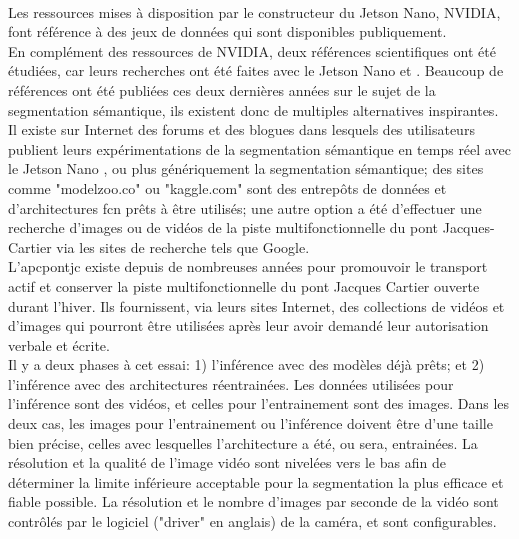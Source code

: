 ﻿\label{metho:data}
\vspace{\baselineskip}
\\
Les ressources mises à disposition par le constructeur du Jetson Nano, NVIDIA, font référence à des jeux de données qui sont disponibles publiquement.
\vspace{\baselineskip}
\\
\noindent En complément des ressources de NVIDIA, deux références scientifiques ont été étudiées, car leurs recherches ont été faites avec le Jetson Nano \parencite{nguyen_mavnet_2019} et \parencite{zheng_real-time_2020}. Beaucoup de références ont été publiées ces deux dernières années sur le sujet de la segmentation sémantique, ils existent donc de multiples alternatives inspirantes.
\vspace{\baselineskip}
\\
\noindent Il existe sur Internet des forums et des blogues dans lesquels des utilisateurs publient leurs expérimentations de la segmentation sémantique en temps réel avec le Jetson Nano \parencite{dustin_realtime_2019}, ou plus génériquement la segmentation sémantique; des sites comme "modelzoo.co" ou "kaggle.com" sont des entrepôts de données et d'architectures \acrshort{fcn} prêts à être utilisés; une autre option a été d'effectuer une recherche d'images ou de vidéos de la piste multifonctionnelle du pont Jacques-Cartier via les sites de recherche tels que Google. 
\vspace{\baselineskip}
\\
\noindent L'\acrlong{apcpontjc} existe depuis de nombreuses années pour promouvoir le transport actif et conserver la piste multifonctionnelle du pont Jacques Cartier ouverte durant l'hiver. Ils fournissent, via leurs sites Internet, des collections de vidéos et d'images qui pourront être utilisées après leur avoir demandé leur autorisation verbale et écrite. \parencite{association_des_pietons_et_cyclistes_du_pont_jacques-cartier_pontjacques-cartier365com_2020, association_des_pietons_et_cyclistes_pont_jacques-cartier_flickr_2020}
\vspace{\baselineskip}
\\
Il y a deux phases à cet essai: 1) l'inférence avec des modèles déjà prêts; et 2) l'inférence avec des architectures réentrainées. Les données utilisées pour l'inférence sont des vidéos, et celles pour l'entrainement sont des images. Dans les deux cas, les images pour l'entrainement ou l'inférence doivent être d'une taille bien précise, celles avec lesquelles l'architecture a été, ou sera, entrainées. La résolution et la qualité de l'image vidéo sont nivelées vers le bas afin de déterminer la limite inférieure acceptable pour la segmentation la plus efficace et fiable possible. La résolution et le nombre d'images par seconde de la vidéo sont contrôlés par le logiciel ("driver" en anglais) de la caméra, et sont configurables. 
